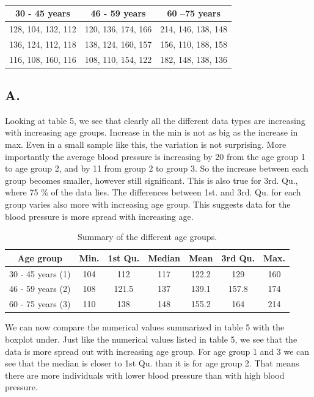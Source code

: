 \documentclass[a4paper,12pt]{article}
\begin{document}
\begin{table}[H]
\caption*{} 
\centering
\begin{tabular}{|c | c | c|} 
\hline\hline
 30 - 45 years  & 46 - 59 years & 60 –75 years \\ [0.5ex] 
\hline
128, 104, 132, 112   & 120, 136, 174, 166 & 214, 146, 138, 148 \\  
\hline
136, 124, 112, 118 & 138, 124, 160, 157 & 156, 110, 188, 158 \\
\hline 
116, 108, 160, 116 & 108, 110, 154, 122 & 182, 148, 138, 136 \\ [1ex] 
\hline\hline
\end{tabular}
\end{table}

\subsection*{A. }

Looking at table 5, we see that clearly all the different data types are increasing with increasing age groups. Increase in the min is not as big as the increase in  max. Even in a small sample like this, the variation is not surprising. More importantly the average blood pressure is increasing by 20 from the age group 1 to age group 2, and by 11 from group 2 to group 3. So the increase between each group becomes smaller, however still significant. This is also true for 3rd. Qu., where 75 \% of the data lies. The differences between 1st. and 3rd. Qu. for each group varies also more with increasing age group. This suggests data for the blood pressure is more spread with increasing age. 

\begin{table}[H]
\caption{Summary of the different age groups.} 
\centering 
\begin{tabular}{c c c c c c c} 
\hline\hline 
 Age group & Min. & 1st Qu. &Median &  Mean & 3rd Qu. &Max.       \\ [0.5ex] 
\hline 
30 - 45 years (1)      &104   &112   &117 &122.2&129&160 \\
46 - 59 years (2)      &108   &121.5   &137 &139.1 &157.8&174 \\
60 - 75 years (3)      &110   &138   &148 &155.2&164&214 \\ [1ex] 
\hline\hline
\end{tabular}
\end{table}

We can now compare the numerical values summarized in table 5 with the boxplot under. Just like the numerical values listed in table 5, we see that the data is more spread out with increasing age group. For age group 1 and 3 we can see that the median is closer to 1st Qu. than it is for age group 2. That means there are more individuals with lower blood pressure than with high blood pressure. 
\end{document}
